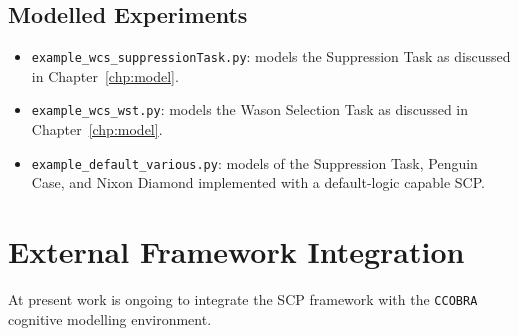 \subsection{Modelled Experiments}
\begin{itemize}
\item \texttt{example\_wcs\_suppressionTask.py}: models the Suppression Task as discussed in Chapter~\ref{chp:model}.
\item \texttt{example\_wcs\_wst.py}: models the Wason Selection Task as discussed in Chapter~\ref{chp:model}.
\item \texttt{example\_default\_various.py}: models of the Suppression Task, Penguin Case, and Nixon Diamond implemented with a default-logic capable SCP.
\end{itemize}

\section{External Framework Integration}
At present work is ongoing to integrate the SCP framework with the \texttt{CCOBRA} \citep{ccobra} cognitive modelling environment.













